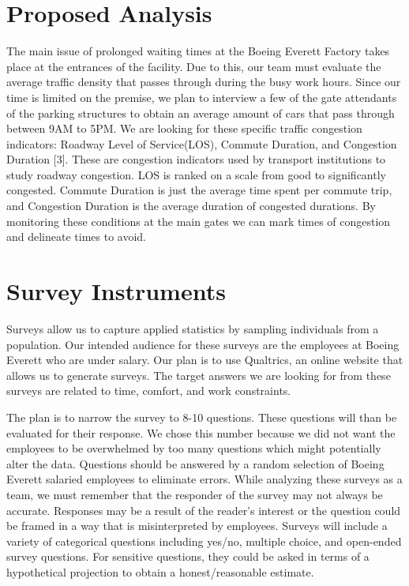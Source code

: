 \documentclass[onecolumn, draftclsnofoot,10pt, compsoc]{IEEEtran}
\begin{document}
\section{Proposed Analysis}
\indent \indent The main issue of prolonged waiting times at the Boeing Everett Factory takes place at the entrances of the facility. 
Due to this, our team must evaluate the average traffic density that passes through during the busy work hours. 
Since our time is limited on the premise, we plan to interview a few of the gate attendants of the parking structures to obtain an average amount of cars that pass through between 9AM to 5PM. 
We are looking for these specific traffic congestion indicators:  Roadway Level of Service(LOS), Commute Duration, and Congestion Duration [3]. 
These are congestion indicators used by transport institutions to study roadway congestion. 
LOS is ranked on a scale from good to significantly congested. Commute Duration is just the average time spent per commute trip, and Congestion Duration is the average duration of congested durations. 
By monitoring these conditions at the main gates we can mark times of congestion and delineate times to avoid.


\section{Survey Instruments}
\indent \indent Surveys allow us to capture applied statistics by sampling individuals from a population. 
Our intended audience for these surveys are the employees at Boeing Everett who are under salary. 
Our plan is to use Qualtrics, an online website that allows us to generate surveys. 
The target answers we are looking for from these surveys are related to time, comfort, and work constraints. 


The plan is to narrow the survey to 8-10 questions. 
These questions will than be evaluated for their response. 
We chose this number because we did not want the employees to be overwhelmed by too many questions which might potentially alter the data. 
Questions should be answered by a random selection of Boeing Everett salaried employees to eliminate errors. 
While analyzing these surveys as a team, we must remember that the responder of the survey may not always be accurate.
Responses may be a result of the reader’s interest or the question could be framed in a way that is misinterpreted by employees. 
Surveys will include a variety of categorical questions including yes/no, multiple choice, and open-ended survey questions. 
For sensitive questions, they could be asked in terms of a hypothetical projection to obtain a honest/reasonable estimate.
\end{document}
